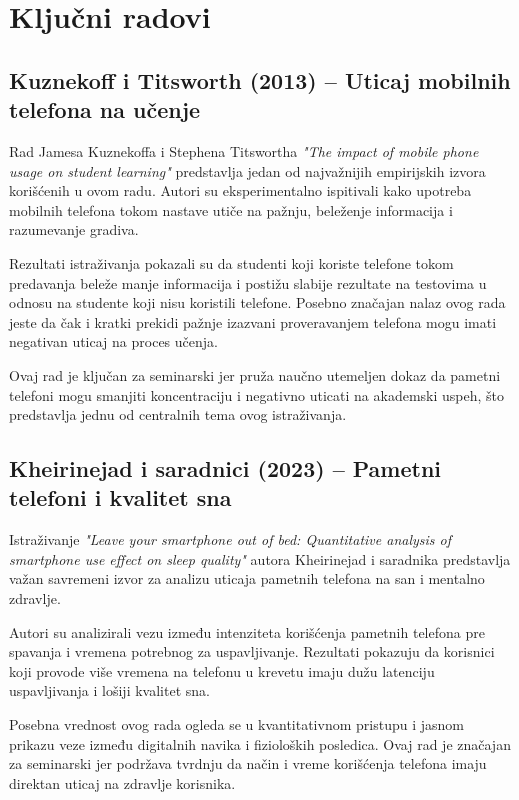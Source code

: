 \documentclass{article}
\begin{document}
\section{Ključni radovi}
\subsection{Kuznekoff i Titsworth (2013) – Uticaj mobilnih telefona na učenje}

Rad Jamesa Kuznekoffa i Stephena Titswortha \textit{"The impact of mobile phone usage on student learning"} predstavlja jedan od najvažnijih empirijskih izvora korišćenih u ovom radu. Autori su eksperimentalno ispitivali kako upotreba mobilnih telefona tokom nastave utiče na pažnju, beleženje informacija i razumevanje gradiva.

Rezultati istraživanja pokazali su da studenti koji koriste telefone tokom predavanja beleže manje informacija i postižu slabije rezultate na testovima u odnosu na studente koji nisu koristili telefone. Posebno značajan nalaz ovog rada jeste da čak i kratki prekidi pažnje izazvani proveravanjem telefona mogu imati negativan uticaj na proces učenja.

Ovaj rad je ključan za seminarski jer pruža naučno utemeljen dokaz da pametni telefoni mogu smanjiti koncentraciju i negativno uticati na akademski uspeh, što predstavlja jednu od centralnih tema ovog istraživanja.

\subsection{Kheirinejad i saradnici (2023) – Pametni telefoni i kvalitet sna}

Istraživanje \textit{"Leave your smartphone out of bed: Quantitative analysis of smartphone use effect on sleep quality"} autora Kheirinejad i saradnika predstavlja važan savremeni izvor za analizu uticaja pametnih telefona na san i mentalno zdravlje.

Autori su analizirali vezu između intenziteta korišćenja pametnih telefona pre spavanja i vremena potrebnog za uspavljivanje. Rezultati pokazuju da korisnici koji provode više vremena na telefonu u krevetu imaju dužu latenciju uspavljivanja i lošiji kvalitet sna.

Posebna vrednost ovog rada ogleda se u kvantitativnom pristupu i jasnom prikazu veze između digitalnih navika i fizioloških posledica. Ovaj rad je značajan za seminarski jer podržava tvrdnju da način i vreme korišćenja telefona imaju direktan uticaj na zdravlje korisnika.
\end{document}
